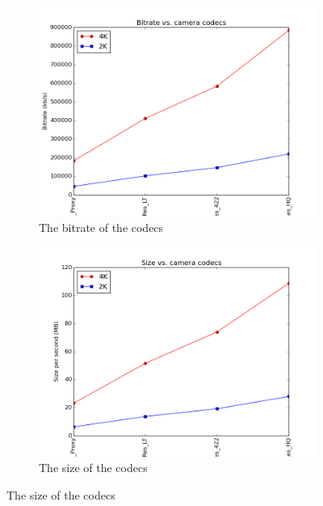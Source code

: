 \documentclass[[12pt,DIV14,BCOR12mm,a4paper,footexclude,headinclude,halfparskip-,twoside,openright,cleardoubleempty,idxtotoc,bibtotoc]{article}
\begin{document}
\begin{figure}[ht]
	\centering
	\begin{subfigure}[b]{0.45\textwidth}
	      \includegraphics[width=\textwidth]{figures/bitrate1.png}
	      \caption{The bitrate of the codecs}
		\label{fig_bit_a}
	\end{subfigure}	        
	\begin{subfigure}[b]{0.45\textwidth}
	       \includegraphics[width=\textwidth]{figures/bitrate2.png}
	       \caption{The size of the codecs}
	\label{fig_bit_b}
	\end{subfigure}


\end{figure}
\end{document}
